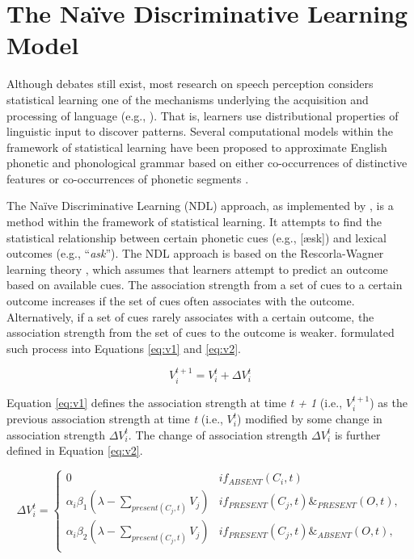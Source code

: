 \section{The Naïve Discriminative Learning Model}

Although debates still exist, most research on speech perception considers statistical learning one of the mechanisms underlying the acquisition and processing of language (e.g., \citealp{Romberg_2010}). That is, learners use distributional properties of linguistic input to discover patterns. Several computational models within the framework of statistical learning have been proposed to approximate English phonetic and phonological grammar based on either co-occurrences of distinctive features \citep{Hayes_2008} or co-occurrences of phonetic segments \citep{Vitevitch_2004, Wieling_2014}.

The Naïve Discriminative Learning (NDL) approach, as implemented by \citet{Baayen_2011}, is a method within the framework of statistical learning. It attempts to find the statistical relationship between certain phonetic cues (e.g., [æsk]) and lexical outcomes (e.g., “\textit{ask}”).  The NDL approach is based on the Rescorla-Wagner learning theory \citep{Rescorla_1972}, which assumes that learners attempt to predict an outcome based on available cues. The association strength from a set of cues to a certain outcome increases if the set of cues often associates with the outcome. Alternatively, if a set of cues rarely associates with a certain outcome, the association strength from the set of cues to the outcome is weaker. \citet{Rescorla_1972} formulated such process into Equations \ref{eq:v1} and \ref{eq:v2}.

\begin{equation} 
\label{eq:v1}
V_i^{t+1} = V_i^t+{\Delta}V_i^t
\end{equation} 

Equation \ref{eq:v1} defines the association strength at time \textit{t + 1} (i.e., $V_i^{t+1}$) as the previous association strength at time \textit{t} (i.e., $V_i^t$) modified by some change in association strength ${\Delta}V_i^t$. The change of association strength ${\Delta}V_i^t$ is further defined in Equation \ref{eq:v2}.

\begin{equation}
\label{eq:v2}
{\Delta}V_i^t = \begin{cases}
  0 & if _{ABSENT} (C_i,t)\\
  {\alpha}_i{\beta}_1({\lambda}-\sum_{present(C_j,t)}V_j) & if _{PRESENT} (C_j,t) \& _{PRESENT} (O,t),\\
  {\alpha}_i{\beta}_2({\lambda}-\sum_{present(C_j,t)}V_j) & if _{PRESENT} (C_j,t) \& _{ABSENT} (O,t),\\
  \end{cases}
\end{equation}

